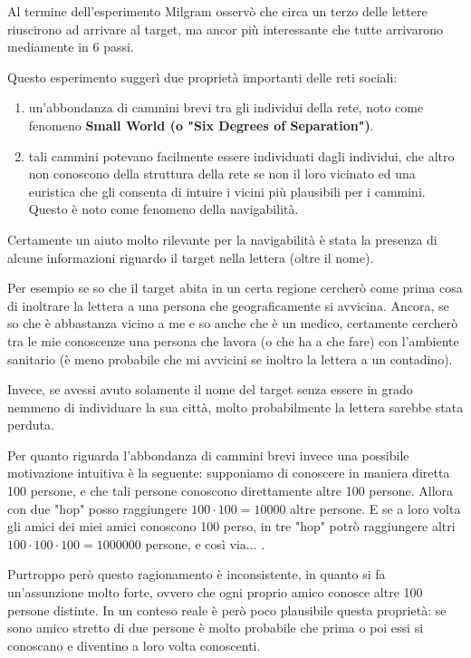 Al termine dell'esperimento Milgram osservò che circa un terzo delle lettere riuscirono ad arrivare al target, ma ancor più interessante che tutte arrivarono mediamente in 6 passi.

Questo esperimento suggerì due proprietà importanti delle reti sociali:
\begin{enumerate}
    \item  un'abbondanza di cammini brevi tra gli individui della rete, noto come fenomeno \textbf{Small World (o "Six Degrees of Separation")}.
    \item tali cammini potevano facilmente essere individuati dagli individui, che altro non conoscono della struttura della rete se non il loro vicinato ed una euristica che gli consenta di intuire i vicini più plausibili per i cammini. Questo è noto come fenomeno della navigabilità.
\end{enumerate}

Certamente un aiuto molto rilevante per la navigabilità è stata la presenza di alcune informazioni riguardo il target nella lettera (oltre il nome).

Per esempio se so che il target abita in un certa regione cercherò come prima cosa di inoltrare la lettera a una persona che geograficamente si avvicina. Ancora, se so che è abbastanza vicino a me e so anche che è un medico, certamente cercherò tra le mie conoscenze una persona che lavora (o che ha a che fare) con l'ambiente sanitario (è meno probabile che mi avvicini se inoltro la lettera a un contadino).

Invece, se avessi avuto solamente il nome del target senza essere in grado nemmeno di individuare la sua città, molto probabilmente la lettera sarebbe stata perduta.

Per quanto riguarda l'abbondanza di cammini brevi invece una possibile motivazione intuitiva è la seguente: supponiamo di conoscere in maniera diretta 100 persone, e che tali persone conoscono direttamente altre 100 persone. Allora con due "hop" posso raggiungere $100 \cdot 100 = 10000$ altre persone. E se a loro volta gli amici dei miei amici conoscono 100 perso, in tre "hop" potrò raggiungere altri $100 \cdot 100 \cdot 100 = 1000000$ persone, e così via... .

Purtroppo però questo ragionamento è inconsistente, in quanto si fa un'assunzione molto forte, ovvero che ogni proprio amico conosce altre 100 persone distinte. In un conteso reale è però poco plausibile questa proprietà: se sono amico stretto di due persone è molto probabile che prima o poi essi si conoscano e diventino a loro volta conoscenti.

